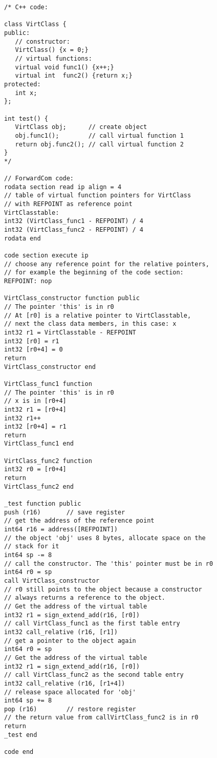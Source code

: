 \documentclass[forwardcom.tex]{subfiles}
\begin{document}
\begin{example}
\label{exampleVirtualFunctions}
\end{example}
\begin{lstlisting}[frame=single]
/* C++ code:

class VirtClass {
public:
   // constructor:
   VirtClass() {x = 0;}
   // virtual functions:
   virtual void func1() {x++;}
   virtual int  func2() {return x;}
protected:
   int x;
};

int test() {
   VirtClass obj;      // create object
   obj.func1();        // call virtual function 1
   return obj.func2(); // call virtual function 2
}
*/

// ForwardCom code:
rodata section read ip align = 4
// table of virtual function pointers for VirtClass
// with REFPOINT as reference point
VirtClasstable:
int32 (VirtClass_func1 - REFPOINT) / 4
int32 (VirtClass_func2 - REFPOINT) / 4
rodata end

code section execute ip
// choose any reference point for the relative pointers, 
// for example the beginning of the code section:
REFPOINT: nop

VirtClass_constructor function public
// The pointer 'this' is in r0
// At [r0] is a relative pointer to VirtClasstable,
// next the class data members, in this case: x
int32 r1 = VirtClasstable - REFPOINT
int32 [r0] = r1
int32 [r0+4] = 0
return
VirtClass_constructor end

VirtClass_func1 function
// The pointer 'this' is in r0
// x is in [r0+4]
int32 r1 = [r0+4]
int32 r1++
int32 [r0+4] = r1
return
VirtClass_func1 end

VirtClass_func2 function
int32 r0 = [r0+4]
return
VirtClass_func2 end

_test function public
push (r16)       // save register
// get the address of the reference point
int64 r16 = address([REFPOINT])
// the object 'obj' uses 8 bytes, allocate space on the 
// stack for it
int64 sp -= 8
// call the constructor. The 'this' pointer must be in r0
int64 r0 = sp
call VirtClass_constructor
// r0 still points to the object because a constructor 
// always returns a reference to the object.
// Get the address of the virtual table
int32 r1 = sign_extend_add(r16, [r0])
// call VirtClass_func1 as the first table entry
int32 call_relative (r16, [r1])
// get a pointer to the object again
int64 r0 = sp
// Get the address of the virtual table
int32 r1 = sign_extend_add(r16, [r0])
// call VirtClass_func2 as the second table entry
int32 call_relative (r16, [r1+4])
// release space allocated for 'obj'
int64 sp += 8
pop (r16)        // restore register
// the return value from callVirtClass_func2 is in r0
return
_test end

code end
\end{lstlisting}
\vspace{4mm}
\end{document}

